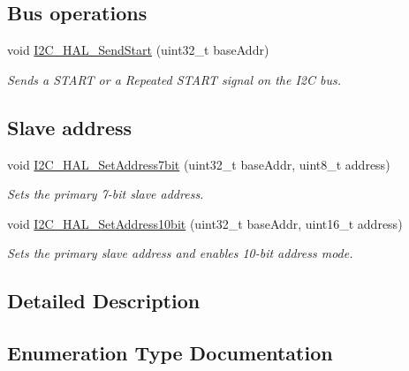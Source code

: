 \subsection*{Bus operations}
\begin{DoxyCompactItemize}
\item 
void \hyperlink{group__i2c__hal_ga1b3a849cc66e30eaff24a49f06da2a77}{I2\+C\+\_\+\+H\+A\+L\+\_\+\+Send\+Start} (uint32\+\_\+t base\+Addr)
\begin{DoxyCompactList}\small\item\em Sends a S\+T\+A\+RT or a Repeated S\+T\+A\+RT signal on the I2C bus. \end{DoxyCompactList}\end{DoxyCompactItemize}
\subsection*{Slave address}
\begin{DoxyCompactItemize}
\item 
void \hyperlink{group__i2c__hal_ga1f0c1d284d62c096bcf1361e7bedef89}{I2\+C\+\_\+\+H\+A\+L\+\_\+\+Set\+Address7bit} (uint32\+\_\+t base\+Addr, uint8\+\_\+t address)
\begin{DoxyCompactList}\small\item\em Sets the primary 7-\/bit slave address. \end{DoxyCompactList}\item 
void \hyperlink{group__i2c__hal_ga581c7e046e0c94bf04ab20d1575be2e1}{I2\+C\+\_\+\+H\+A\+L\+\_\+\+Set\+Address10bit} (uint32\+\_\+t base\+Addr, uint16\+\_\+t address)
\begin{DoxyCompactList}\small\item\em Sets the primary slave address and enables 10-\/bit address mode. \end{DoxyCompactList}\end{DoxyCompactItemize}


\subsection{Detailed Description}


\subsection{Enumeration Type Documentation}
